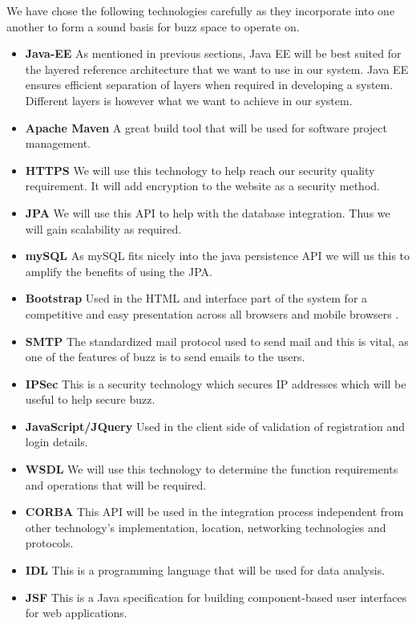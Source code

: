 We have chose the following technologies carefully as they incorporate into one another to form a sound basis for buzz space to operate on.

\begin{itemize}
	\item \textbf{Java-EE}
		As mentioned in previous sections, Java EE will be best suited for the layered reference architecture that we want to use in our system. Java EE ensures efficient separation of layers when required in developing a system. Different layers is however what we want to achieve in our system.
	\item \textbf{Apache Maven}
		A great build tool that will be used for software project management.
	\item \textbf{HTTPS}
		We will use this technology to help reach our security quality requirement. It will add encryption to the website as a security method. 
	\item \textbf{JPA}
		We will use this API to help with the database integration. Thus we will gain scalability as required.
	\item \textbf{mySQL}
		As mySQL fits nicely into the java persistence API we will us this to amplify the benefits of using the JPA.
		
		\item \textbf{Bootstrap}
		Used in the HTML and interface part of the system for a competitive and easy presentation across all browsers 	and mobile browsers .
		\item \textbf{SMTP} The standardized mail protocol used to send mail and this is vital, as one of the features of buzz is to send emails to the users.
		\item \textbf{IPSec} This is a security technology which secures IP addresses which will be useful to help secure buzz.
	\item \textbf{JavaScript/JQuery}
		Used in the client side of validation of registration and login details.
	\item \textbf{WSDL} 
		We will use this technology to determine the function requirements and operations that will be required.
	\item \textbf{CORBA}
		This API will be used in the integration process independent from other technology's implementation, location, networking 	technologies and protocols.
	\item \textbf{IDL}
		This is a programming language that will be used for data analysis. 
		
		\item \textbf{JSF} This is a Java specification for building component-based user interfaces for web applications.
			

\end{itemize}
